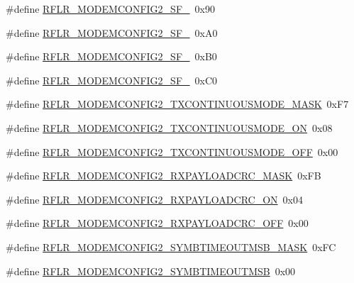 \begin{DoxyCompactItemize}
\item 
\#define \hyperlink{sx1276Regs-LoRa_8h_aa08790a707957dd4af566cb0c8d85299}{R\+F\+L\+R\+\_\+\+M\+O\+D\+E\+M\+C\+O\+N\+F\+I\+G2\+\_\+\+S\+F\+\_}~0x90
\item 
\#define \hyperlink{sx1276Regs-LoRa_8h_ad13461cea4b7c46dcb9043766b435ccf}{R\+F\+L\+R\+\_\+\+M\+O\+D\+E\+M\+C\+O\+N\+F\+I\+G2\+\_\+\+S\+F\+\_}~0x\+A0
\item 
\#define \hyperlink{sx1276Regs-LoRa_8h_a10a0b7d83cf516794592fe46263ebfb8}{R\+F\+L\+R\+\_\+\+M\+O\+D\+E\+M\+C\+O\+N\+F\+I\+G2\+\_\+\+S\+F\+\_}~0x\+B0
\item 
\#define \hyperlink{sx1276Regs-LoRa_8h_ab5d322da73b14a285604eb9d9cee496f}{R\+F\+L\+R\+\_\+\+M\+O\+D\+E\+M\+C\+O\+N\+F\+I\+G2\+\_\+\+S\+F\+\_}~0x\+C0
\item 
\#define \hyperlink{sx1276Regs-LoRa_8h_a56711c409baa81b02691cbdd892d99da}{R\+F\+L\+R\+\_\+\+M\+O\+D\+E\+M\+C\+O\+N\+F\+I\+G2\+\_\+\+T\+X\+C\+O\+N\+T\+I\+N\+U\+O\+U\+S\+M\+O\+D\+E\+\_\+\+M\+A\+SK}~0x\+F7
\item 
\#define \hyperlink{sx1276Regs-LoRa_8h_a8ff8561f45a2fd07a2c89fdf43d0142a}{R\+F\+L\+R\+\_\+\+M\+O\+D\+E\+M\+C\+O\+N\+F\+I\+G2\+\_\+\+T\+X\+C\+O\+N\+T\+I\+N\+U\+O\+U\+S\+M\+O\+D\+E\+\_\+\+ON}~0x08
\item 
\#define \hyperlink{sx1276Regs-LoRa_8h_a2044b58e88e240089fa471c3c7093982}{R\+F\+L\+R\+\_\+\+M\+O\+D\+E\+M\+C\+O\+N\+F\+I\+G2\+\_\+\+T\+X\+C\+O\+N\+T\+I\+N\+U\+O\+U\+S\+M\+O\+D\+E\+\_\+\+O\+FF}~0x00
\item 
\#define \hyperlink{sx1276Regs-LoRa_8h_a6a4d6c789643526dc38fda7cb00d2a46}{R\+F\+L\+R\+\_\+\+M\+O\+D\+E\+M\+C\+O\+N\+F\+I\+G2\+\_\+\+R\+X\+P\+A\+Y\+L\+O\+A\+D\+C\+R\+C\+\_\+\+M\+A\+SK}~0x\+FB
\item 
\#define \hyperlink{sx1276Regs-LoRa_8h_a29918f9915b10596c1a1403dc722c70f}{R\+F\+L\+R\+\_\+\+M\+O\+D\+E\+M\+C\+O\+N\+F\+I\+G2\+\_\+\+R\+X\+P\+A\+Y\+L\+O\+A\+D\+C\+R\+C\+\_\+\+ON}~0x04
\item 
\#define \hyperlink{sx1276Regs-LoRa_8h_a33586afd95b43ba36a0fa9fd199b0991}{R\+F\+L\+R\+\_\+\+M\+O\+D\+E\+M\+C\+O\+N\+F\+I\+G2\+\_\+\+R\+X\+P\+A\+Y\+L\+O\+A\+D\+C\+R\+C\+\_\+\+O\+FF}~0x00
\item 
\#define \hyperlink{sx1276Regs-LoRa_8h_a6a9255e1645c7a286b74c1a03980a7a1}{R\+F\+L\+R\+\_\+\+M\+O\+D\+E\+M\+C\+O\+N\+F\+I\+G2\+\_\+\+S\+Y\+M\+B\+T\+I\+M\+E\+O\+U\+T\+M\+S\+B\+\_\+\+M\+A\+SK}~0x\+FC
\item 
\#define \hyperlink{sx1276Regs-LoRa_8h_a2ac4fd798c0f4cca3b5b5f911da77941}{R\+F\+L\+R\+\_\+\+M\+O\+D\+E\+M\+C\+O\+N\+F\+I\+G2\+\_\+\+S\+Y\+M\+B\+T\+I\+M\+E\+O\+U\+T\+M\+SB}~0x00

\end{DoxyCompactItemize}
